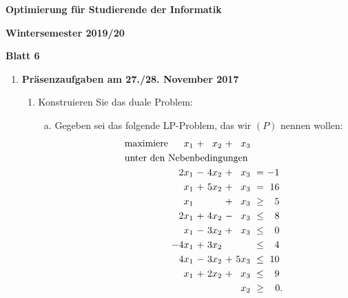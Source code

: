 \documentclass[11pt, a4paper]{article}
\begin{document}
\begin{center}
\begin{Large}
\textbf{Optimierung für Studierende der Informatik}
\end{Large}

\textbf{}
	
\vspace{0.5cm}

\textbf{Wintersemester 2019/20}

\textbf{Blatt 6}

\vspace{0.5cm}
\end{center}

\small

\begin{enumerate}[\bfseries A:]


\item \textbf{Präsenzaufgaben am 27./28. November 2017}

\begin{enumerate}[\bfseries 1.]

\item Konstruieren Sie das duale Problem:
\begin{enumerate}[a)]
\item Gegeben sei das folgende LP-Problem, das wir $(P)$ nennen wollen:
\begin{align*}
\begin{alignedat}{5}
& \text{maximiere } & x_1 &\ + &\ x_2 &\ + &\ x_3 & & \\
& \rlap{unter den Nebenbedingungen} & & & & & & & \\
&&  2x_1 &\ - &\ 4x_2 &\ + &\  x_3 &\ =    &\ -1\ \\
&&   x_1 &\ + &\ 5x_2 &\ + &\  x_3 &\ =    &\ 16\ \\
&&   x_1 &\   &\      &\ + &\  x_3 &\ \geq &\  5\ \\
&&  2x_1 &\ + &\ 4x_2 &\ - &\  x_3 &\ \leq &\  8\ \\
&&   x_1 &\ - &\ 3x_2 &\ + &\  x_3 &\ \leq &\  0\ \\
&& -4x_1 &\ + &\ 3x_2 &\   &\      &\ \leq &\  4\ \\
&&  4x_1 &\ - &\ 3x_2 &\ + &\ 5x_3 &\ \leq &\ 10\ \\
&&   x_1 &\ + &\ 2x_2 &\ + &\  x_3 &\ \leq &\  9\ \\
&&&&&& \llap{$x_2$} &\ \geq &\ 0.
\end{alignedat}
\end{align*}


\end{enumerate}
\end{enumerate}
\end{enumerate}
\end{document}
